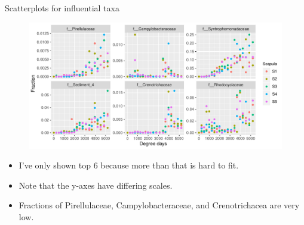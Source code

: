 \documentclass{beamer}
\begin{document}
\begin{frame}{Scatterplots for influential taxa}

  \begin{center}
    \begin{figure}
      \includegraphics[width=4.75in]{use_families/w_scapulae/infl_scapula_family_scatter}
    \end{figure}
  \end{center}
  \vspace{-0.25in}
  {\scriptsize
  \begin{itemize}
  \item I've only shown top 6 because more than that is hard to fit.
  \item Note that the y-axes have differing scales.
  \item Fractions of Pirellulaceae, Campylobacteraceae, and Crenotrichacea
  are very low.
  \end{itemize}
  }

\end{frame}
\end{document}
